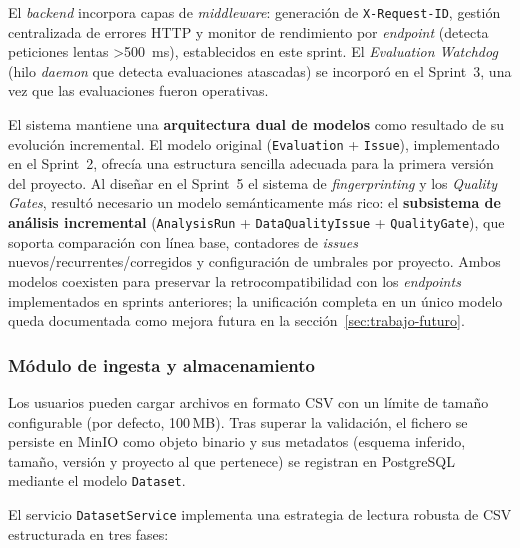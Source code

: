 El \emph{backend} incorpora capas de \emph{middleware}: generación de
\texttt{X-Request-ID}, gestión centralizada de errores HTTP y monitor de
rendimiento por \emph{endpoint} (detecta peticiones lentas >500~ms),
establecidos en este sprint.  El \emph{Evaluation Watchdog} (hilo
\emph{daemon} que detecta evaluaciones atascadas) se incorporó en el
Sprint~3, una vez que las evaluaciones fueron operativas.

El sistema mantiene una \textbf{arquitectura dual de modelos} como resultado
de su evolución incremental.  El modelo original (\texttt{Evaluation} +
\texttt{Issue}), implementado en el Sprint~2, ofrecía una estructura sencilla
adecuada para la primera versión del proyecto.  Al diseñar en el Sprint~5 el sistema de
\emph{fingerprinting} y los \emph{Quality Gates}, resultó necesario un modelo
semánticamente más rico: el \textbf{subsistema de análisis incremental}
(\texttt{AnalysisRun} + \texttt{DataQualityIssue} + \texttt{QualityGate}),
que soporta comparación con línea base, contadores de \emph{issues}
nuevos/recurrentes/corregidos y configuración de umbrales por proyecto.
Ambos modelos coexisten para preservar la retrocompatibilidad con los
\emph{endpoints} implementados en sprints anteriores; la unificación
completa en un único modelo queda documentada como mejora futura en la
sección~\ref{sec:trabajo-futuro}.

\subsubsection{Módulo de ingesta y almacenamiento}
\label{sec:impl-ingesta}

Los usuarios pueden cargar archivos en formato \ac{CSV} con un límite de
tamaño configurable (por defecto, 100\,MB).  Tras superar la validación,
el fichero se persiste en MinIO como objeto binario y sus metadatos
(esquema inferido, tamaño, versión y proyecto al que pertenece) se
registran en PostgreSQL mediante el modelo \texttt{Dataset}.

El servicio \texttt{DatasetService} implementa una estrategia de lectura
robusta de \ac{CSV} estructurada en tres fases:

